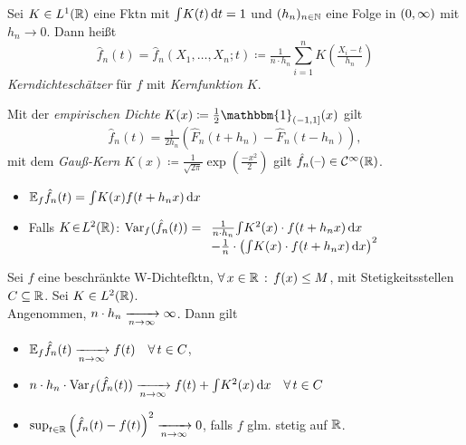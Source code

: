 \documentclass{cheat-sheet}
\newcommand{\E}{\mathbb{E}} %
\newcommand{\ind}{\mathbbm{1}} %
\newcommand{\Cont}{\mathcal{C}} %
\DeclareMathOperator{\var}{Var} %
\begin{document}
\begin{defn}
  Sei $K \in L^1(\mathbb{R})$ eine Fktn mit ${\textstyle \int} K(t) \,\mathrm{d} t = 1$ und $(h_n)_{n \in \mathbb{N}}$ eine Folge in $\left( 0, \infty \right)$ mit $h_n \to 0$.
  Dann heißt
  \[
    \hat{f}_n(t) = \hat{f}_n(X_1, \ldots, X_n; t) \coloneqq \tfrac{1}{n \cdot h_n} \sum_{i=1}^n K \left( \tfrac{X_i - t}{h_n} \right)
  \]
  \emph{Kerndichteschätzer} für $f$ mit \emph{Kernfunktion} $K$.
\end{defn}

\begin{bspe}
  Mit der \emph{empirischen Dichte} $K(x) \coloneqq \tfrac{1}{2} \ind_{\ocinterval{-1}{1}}(x)$ gilt
  \[ \hat{f}_n(t) = \tfrac{1}{2 h_n} \left( \hat{F}_n(t + h_n) - \hat{F}_n(t - h_n) \right), \]
  mit dem \emph{Gauß-Kern} $K(x) \coloneqq \tfrac{1}{\sqrt{2 \pi}}\exp( \tfrac{- x^2}{2})$ gilt $\hat{f}_n(\blank) \in \Cont^\infty(\R)$.
\end{bspe}

\begin{lem}
  \begin{itemize}
    \item $\E_f \hat{f}_n(t) = \IInt{K(x) f(t + h_n x)}{x}$
    \item Falls $K \!\in\! L^2(\mathbb{R})$: \enspace
    $\var_f (\hat{f}_n(t)) = 
    \begin{array}[t]{l}
      \tfrac{1}{n \cdot h_n} \IInt{K^2(x) \cdot f(t + h_n x)}{x} \\
      - \tfrac{1}{n} \cdot \left( \IInt{K(x) \cdot f(t + h_n x)}{x} \right)^2
    \end{array}$
  \end{itemize}
\end{lem}

\begin{satz}
  Sei $f$ eine beschränkte W-Dichtefktn, $\forall \, {x \in \mathbb{R}} \,:\, f(x) \leq M$, mit Stetigkeitsstellen $C \subseteq \mathbb{R}$.
  Sei $K \in L^2(\mathbb{R})$. \\
  Angenommen, $n \cdot h_n \xrightarrow[n \to \infty]{} \infty$.
  Dann gilt
  \begin{itemize}
    \item $\E_f \hat{f}_n(t) \xra[n \to \infty]{} f(t) \quad \forall \, t \in C$,
    \item $n \cdot h_n \cdot \var_f (\hat{f}_n(t)) \xra[n \to \infty]{} f(t) + \IInt{K^2(x)}{x} \quad \forall \, t \in C$
    \item $\sup_{t \in \mathbb{R}} \left( \hat{f}_n(t) - f(t) \right)^2 \xrightarrow[n \to \infty]{} 0$, falls $f$ glm. stetig auf $\mathbb{R}$.
  \end{itemize}
\end{satz}
\end{document}
